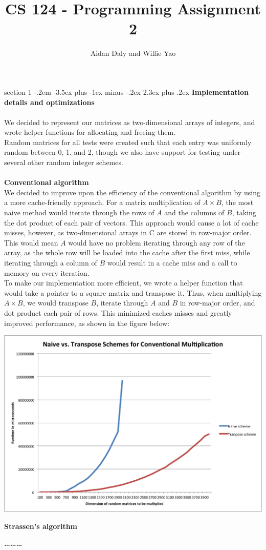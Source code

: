 \documentclass[12pt]{article}
\title{CS 124 - Programming Assignment 2}
\author{Aidan Daly and Willie Yao}
\makeatletter
\newenvironment{problem}{\@startsection
       {section}
       {1}
       {-.2em}
       {-3.5ex plus -1ex minus -.2ex}
       {2.3ex plus .2ex}
       {\pagebreak[3]%
       \large\bf\noindent{Problem }
       }
       }
       {%
       \begin{center}\large\bf \ldots\ldots\ldots\end{center}}
\makeatother
\begin{document}
\maketitle

\begin{problem}{}
\textbf{Implementation details and optimizations}\\
\\
\noindent We decided to represent our matrices as two-dimensional arrays of
integers, and wrote helper functions for allocating and freeing
them. \\

\noindent Random matrices for all tests were created such that each entry was uniformly random between 0, 1, and 2, though we also have support for testing under several other random integer schemes.\\
\\
\textbf{Conventional algorithm}\\

\noindent We decided to improve upon the efficiency of the conventional algorithm by using a more cache-friendly approach.  For a matrix multiplication of $A \times B$, the most naive method would iterate through the rows of $A$ and the columns of $B$, taking the dot product of each pair of vectors.  This approach would cause a lot of cache misses, however, as two-dimensional arrays in C are stored in row-major order.  This would mean $A$ would have no problem iterating through any row of the array, as the whole row will be loaded into the cache after the first miss, while iterating through a column of $B$ would result in a cache miss and a call to memory on every iteration.\\

\noindent To make our implementation more efficient, we wrote a helper function that would take a pointer to a square matrix and transpose it.  Thus, when multiplying $A \times B$, we would transpose $B$, iterate through $A$ and $B$ in row-major order, and dot product each pair of rows.  This minimized caches misses and greatly improved performance, as shown in the figure below:
\begin{center}
\includegraphics[scale=.70]{figs/conventional.png}
\end{center}
\textbf{Strassen's algorithm}\\


\end{problem}
\end{document}
